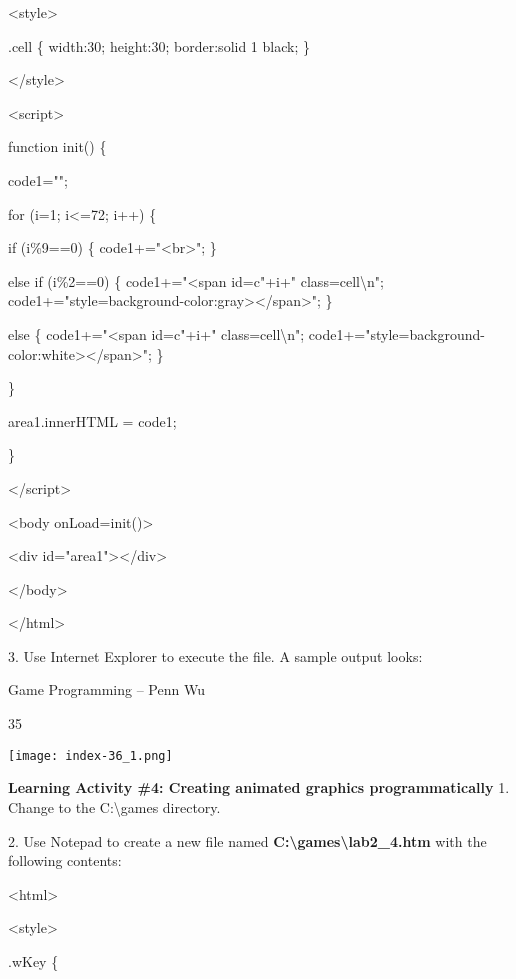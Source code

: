\documentclass[
]{article}
\begin{document}
\textless style\textgreater{}

.cell \{ width:30; height:30; border:solid 1 black; \}

\textless/style\textgreater{}

\textless script\textgreater{}

function init() \{

code1="";

for (i=1; i\textless=72; i++) \{

if (i\%9==0) \{ code1+="\textless br\textgreater"; \}

else if (i\%2==0) \{ code1+="\textless span id=c"+i+"
class=cell\textbackslash n";
code1+="style=\textquotesingle background-color:gray\textquotesingle\textgreater\textless/span\textgreater";
\}

else \{ code1+="\textless span id=c"+i+" class=cell\textbackslash n";
code1+="style=\textquotesingle background-color:white\textquotesingle\textgreater\textless/span\textgreater";
\}

\}

area1.innerHTML = code1;

\}

\textless/script\textgreater{}

\textless body onLoad=init()\textgreater{}

\textless div id="area1"\textgreater\textless/div\textgreater{}

\textless/body\textgreater{}

\textless/html\textgreater{}

3. Use Internet Explorer to execute the file. A sample output looks:

\textbf{}

Game Programming -- Penn Wu

35

\protect\hypertarget{index_split_003.htmlux5cux23p36}{}{}\texttt{[image: index-36\_1.png]}

\textbf{}

\textbf{}

\textbf{Learning Activity \#4: Creating animated graphics
programmatically} 1. Change to the C:\textbackslash games directory.

2. Use Notepad to create a new file named
\textbf{C:\textbackslash games\textbackslash lab2\_4.htm} with the
following contents:

\textless html\textgreater{}

\textless style\textgreater{}

.wKey \{
\end{document}
